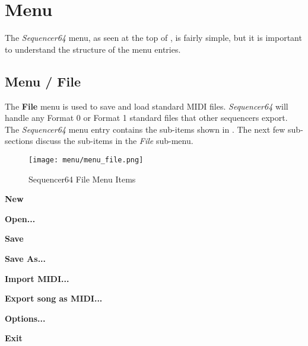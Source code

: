 %
%
%

\section{Menu}
\label{sec:seq64_menu}

   The \textsl{Sequencer64} menu, as seen at the top of
   , is fairly simple, but it is important to
   understand the structure of the menu entries.

\subsection{Menu / File}
\label{subsec:seq64_menu_file}

   The \textbf{File} menu is used to save and load standard MIDI files.
   \textsl{Sequencer64} will handle any Format 0 or
   Format 1 standard files that other sequencers export.
   The \textsl{Sequencer64} menu entry contains the sub-items shown in
   .  The next few sub-sections discuss
   the sub-items in the \textsl{File} sub-menu.

\begin{figure}[H]
   \centering 
   \texttt{[image: menu/menu\_file.png]}
   \caption{Sequencer64 File Menu Items}
   \label{fig:seq64_menu_file_items}
\end{figure}

   \begin{enumber}
      \item \textbf{New}
      \item \textbf{Open...}
      \item \textbf{Save}
      \item \textbf{Save As...}
      \item \textbf{Import MIDI...}
      \item \textbf{Export song as MIDI...}
      \item \textbf{Options...}
      \item \textbf{Exit}
   \end{enumber}

